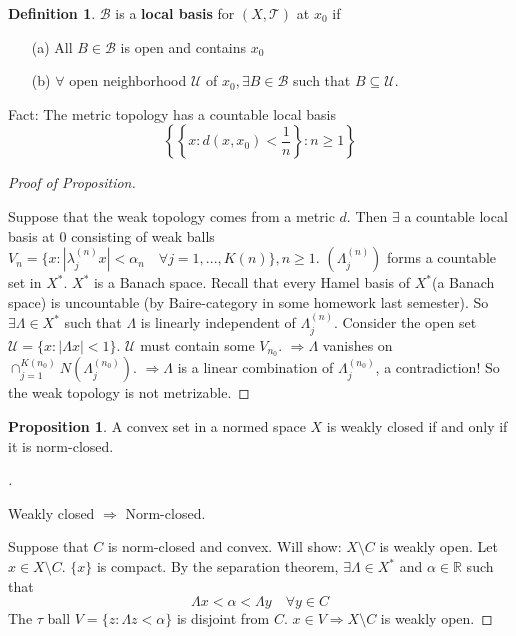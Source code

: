 \documentclass{article}
\theoremstyle{definition}
\newtheorem{dfn}{Definition}
\newtheorem{prop}{Proposition}
\newenvironment{proofs}[1][\proofname]{%
  \begin{proof}[#1]$ $\par\nobreak\ignorespaces
}{%
  \end{proof}
}
\newcommand{\B}{\mathcal B}
\newcommand{\RR}{\mathbb R}
\newcommand{\T}{\mathcal T}
\newcommand{\U}{\mathcal U}
\newcommand{\Ra}{\Rightarrow}
\begin{document}
\begin{dfn}
	$\B$ is a \textbf{local basis} for $(X, \T)$ at $x_0$ if 
	\begin{enumerate}
		\item[(a)] All $B \in \B$ is open and contains $x_0$

		\item[(b)] $\forall$ open neighborhood $\U$ of $x_0, \exists B \in \B$ such that $B \subseteq \U$.
	\end{enumerate}
\end{dfn}

Fact: The metric topology has a countable local basis
\[
	\left\{ \left\{ x: d(x, x_0) < \frac{1}{n} \right\}: n \geq 1 \right\}
\]

\begin{proofs}[Proof of Proposition]
	Suppose that the weak topology comes from a metric $d$.
	Then $\exists$ a countable local basis at $0$ consisting of weak balls $V_n = \{x: |\lambda_j^{(n)}x| < \alpha_n \quad \forall j = 1, ..., K(n)\}, n \geq 1$.
	$(\Lambda_j^{(n)})$ forms a countable set in $X^*$.
	$X^*$ is a Banach space.
	Recall that every Hamel basis of $X^*$(a Banach space) is uncountable (by Baire-category in some homework last semester).
	So $\exists \Lambda \in X^*$ such that $\Lambda$ is linearly independent of $\Lambda_j^{(n)}$.
	Consider the open set $\U = \{x: |\Lambda x| < 1\}$.
	$\U$ must contain some $V_{n_0}$.
	$\Ra \Lambda$ vanishes on $\cap_{j = 1}^{K(n_0)} N(\Lambda_j^{(n_0)})$.
	$\Ra \Lambda$ is a linear combination of $\Lambda_j^{(n_0)}$, a contradiction!
	So the weak topology is not metrizable.
\end{proofs}

\begin{prop}
	A convex set in a normed space $X$ is weakly closed if and only if it is norm-closed.
\end{prop}

\begin{proofs}
	Weakly closed $\Ra$ Norm-closed.

	\par Suppose that $C$ is norm-closed and convex.
	Will show: $X \setminus C$ is weakly open.
	Let $x \in X \setminus C$.
	$\{x\}$ is compact.
	By the separation theorem, $\exists \Lambda \in X^*$ and $\alpha \in \RR$ such that
	\[
		\Lambda x < \alpha < \Lambda y \quad \forall y \in C
	\]
	The $\tau$ ball $V = \{z: \Lambda z < \alpha\}$ is disjoint from $C$.
	$x \in V \Ra X\setminus C$ is weakly open.
\end{proofs}
\end{document}
